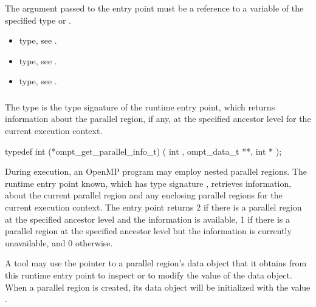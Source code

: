 \constraints
The argument passed to the entry point must be a reference
to a variable of the specified type or .

\crossreferences
\begin{itemize}
\item {} type, see .

\item {} type, see .

\item {} type, see .
\end{itemize}



\subsubsection{}
\label{sec:ompt_get_parallel_info_t}
\label{sec:ompt_get_parallel_info}

\summary
The  type is the type signature of the 
 runtime entry point, which returns information 
about the parallel region, if any, at the specified ancestor level for 
the current execution context.

\format
\begin{ccppspecific}
\begin{omptInquiry}
typedef int (*ompt_get_parallel_info_t) (
  int ,
  ompt_data_t **,
  int *
);
\end{omptInquiry}
\end{ccppspecific}

\descr
During execution, an OpenMP program may employ nested parallel regions.
The  runtime entry point known, which has
type signature , retrieves information,
about the current parallel region and any enclosing parallel regions 
for the current execution context. The entry point returns 2 if there 
is a parallel region at the specified ancestor level and the information 
is available, 1 if there is a parallel region at the specified ancestor 
level but the information is currently unavailable, and 0 otherwise.

A tool may use the pointer to a parallel region's data object that it
obtains from this runtime entry point to inspect or to modify the value
of the data object. When a parallel region is created, its data
object will be initialized with the value .

